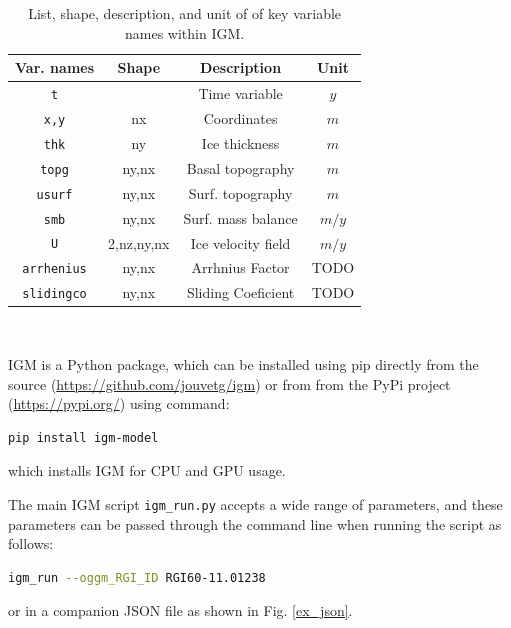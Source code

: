\documentclass[10pt,twocolumn]{article}
\begin{document}
\begin{table}
\begin{tabular}{|c|c|c|c|}
\hline 
Var. names &     Shape        & Description                       & Unit    \\
\hline
\texttt{t}              &                &  Time variable                    & $y$       \\
\texttt{x,y}            & nx             &  Coordinates                      & $m$       \\
\texttt{thk}            & ny             &  Ice thickness                    & $m$      \\
\texttt{topg}           & ny,nx          &  Basal topography                 & $m$       \\
\texttt{usurf}          & ny,nx          &  Surf. topography                 & $m$       \\
\texttt{smb}            & ny,nx          &  Surf. mass balance               & $m/y$ \\ %
\texttt{U}              & 2,nz,ny,nx     &  Ice velocity field               & $m/y$     \\
\texttt{arrhenius}      & ny,nx          &  Arrhnius Factor                  & TODO \\ %
\texttt{slidingco}      & ny,nx          &  Sliding Coeficient               & TODO \\
\hline 
\end{tabular} 
$ $ \\
\caption{List, shape, description, and unit of  of key variable names within IGM.  \label{variable_name}}
\end{table}

IGM is a Python package, which can be installed using pip directly from the source 
(\url{https://github.com/jouvetg/igm}) or from from the PyPi project (\url{https://pypi.org/})
using command:
\begin{lstlisting}[language=bash,frame=single,numbers=none]
pip install igm-model
\end{lstlisting}  
which installs IGM for CPU and GPU usage. 

The main IGM script \texttt{igm\_run.py} accepts a wide range of parameters, 
and these parameters can be passed through the command line when running the script
as follows:
\begin{lstlisting}[language=bash,frame=single,numbers=none]
igm_run --oggm_RGI_ID RGI60-11.01238
\end{lstlisting} 
or in a companion JSON file as shown in Fig. \ref{ex_json}.
\end{document}
